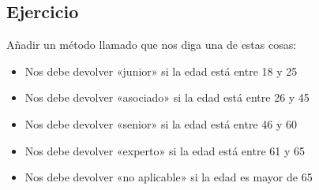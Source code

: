 \documentclass[letterpaper,10pt,spanish]{sphinxmanual}
\begin{document}
\subsection{Ejercicio}
\label{\detokenize{tema4:id3}}
Añadir un método llamado  que nos diga una de estas cosas:
\begin{itemize}
\item {} 
Nos debe devolver «junior» si la edad está entre 18 y 25

\item {} 
Nos debe devolver «asociado» si la edad está entre 26 y 45

\item {} 
Nos debe devolver «senior» si la edad está entre 46 y 60

\item {} 
Nos debe devolver «experto» si la edad está entre 61 y 65

\item {} 
Nos debe devolver «no aplicable» si la edad es mayor de 65

\end{itemize}

\begin{sphinxVerbatim}[commandchars=\\\{\}]
     
     
          
             
          
             
              
             
              
             
\end{sphinxVerbatim}
\end{document}
